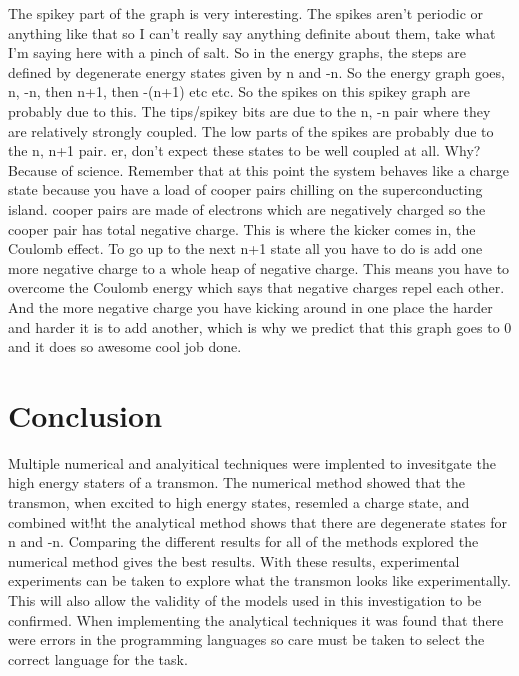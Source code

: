 \documentclass[11pt]{article}
\begin{document}
The spikey part of the graph is very interesting. The spikes aren't periodic or anything like that so I can't really say anything definite about them, take what I'm saying here with a pinch of salt. So in the energy graphs, the steps are defined by degenerate energy states given by n and -n. So the energy graph goes, n, -n, then n+1, then -(n+1) etc etc. So the spikes on this spikey graph are probably due to this. The tips/spikey bits are due to the n, -n pair where they are relatively strongly coupled. The low parts of the spikes are probably due to the n, n+1 pair. er, don't expect these states to be well coupled at all. Why? Because of science. Remember that at this point the system behaves like a charge state because you have a load of cooper pairs chilling on the superconducting island. cooper pairs are made of electrons which are negatively charged so the cooper pair has total negative charge. This is where the kicker comes in, the Coulomb effect. To go up to the next n+1 state all you have to do is add one more negative charge to a whole heap of negative charge. This means you have to overcome the Coulomb energy which says that negative charges repel each other. And the more negative charge you have kicking around in one place the harder and harder it is to add another, which is why we predict that this graph goes to 0 and it does so awesome cool job done.

\section{Conclusion}
Multiple numerical and analyitical techniques were implented to invesitgate the high energy staters of a transmon. The numerical method showed that the transmon, when excited to high energy states, resemled a charge state, and combined wit!ht the analytical method shows that there are degenerate states for n and -n. Comparing the different results for all of the methods explored the numerical method gives the best results. With these results, experimental experiments can be taken to explore what the transmon looks like experimentally. This will also allow the validity of the models used in this investigation to be confirmed.
When implementing the analytical techniques it was found that there were errors in the programming languages so care must be taken to select the correct language for the task.
\end{document}
